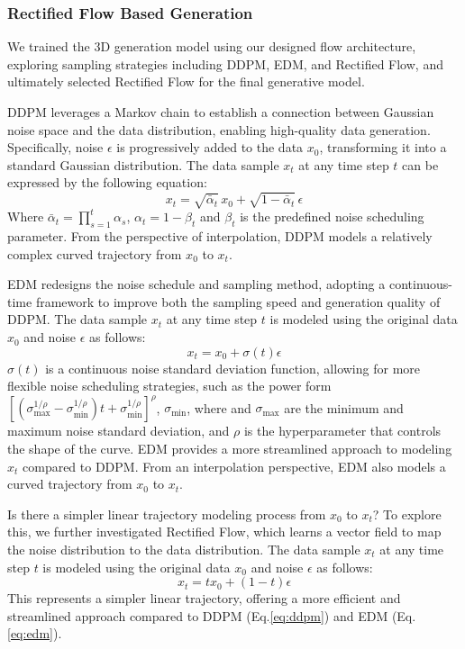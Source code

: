 \subsubsection{Rectified Flow Based Generation}
We trained the 3D generation model using our designed flow architecture, exploring sampling strategies including DDPM, EDM, and Rectified Flow, and ultimately selected Rectified Flow for the final generative model.

DDPM leverages a Markov chain to establish a connection between Gaussian noise space and the data distribution, enabling high-quality data generation. Specifically, noise $\epsilon$ is progressively added to the data $x_0$, transforming it into a standard Gaussian distribution. The data sample $x_t$ at any time step $t$ can be expressed by the following equation:
\begin{equation}\label{eq:ddpm}
x_t = \sqrt{\bar{\alpha}_t} \, x_0 + \sqrt{1 - \bar{\alpha}_t} \, \epsilon
\end{equation}
Where 
$\bar{\alpha}_t = \prod_{s=1}^t \alpha_s$, 
$\alpha_t = 1 - \beta_t$
and $\beta_t$ is the predefined noise scheduling parameter.
From the perspective of interpolation, DDPM models a relatively complex curved trajectory from $x_0$ to $x_t$.


EDM redesigns the noise schedule and sampling method, adopting a continuous-time framework to improve both the sampling speed and generation quality of DDPM. The data sample $x_t$ at any time step $t$ is modeled using the original data $x_0$ and noise $\epsilon$ as follows:
\begin{equation}\label{eq:edm}
x_t = x_0 + \sigma(t)\epsilon
\end{equation}
$\sigma(t)$ is a continuous noise standard deviation function, allowing for more flexible noise scheduling strategies, such as the power form $\left[ \left( \sigma_{\text{max}}^{1/\rho} - \sigma_{\text{min}}^{1/\rho} \right) t + \sigma_{\text{min}}^{1/\rho} \right]^\rho$, $\sigma_{\text{min}}$, where and $\sigma_{\text{max}}$ are the minimum and maximum noise standard deviation, and $\rho$ is the hyperparameter that controls the shape of the curve. 
EDM provides a more streamlined approach to modeling $x_t$ compared to DDPM. From an interpolation perspective, EDM also models a curved trajectory from $x_0$ to $x_t$.

Is there a simpler linear trajectory modeling process from $x_0$ to $x_t$? To explore this, we further investigated Rectified Flow, which learns a vector field to map the noise distribution to the data distribution. The data sample $x_t$ at any time step $t$ is modeled using the original data $x_0$ and noise $\epsilon$ as follows:
\begin{equation}\label{eq:rf}
x_t = t x_0 + (1-t)\epsilon
\end{equation}
This represents a simpler linear trajectory, offering a more efficient and streamlined approach compared to DDPM (Eq.\ref{eq:ddpm}) and EDM (Eq.\ref{eq:edm}).


